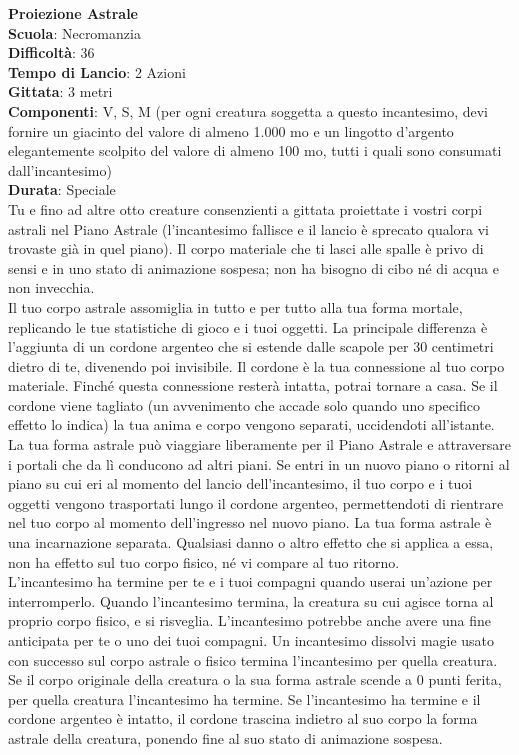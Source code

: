 \begin{multicols}{2}
\medskip\textbf{Proiezione Astrale}\\
\textbf{Scuola}: Necromanzia\\
\textbf{Difficoltà}: 36\\
\textbf{Tempo di Lancio}: 2 Azioni\\
\textbf{Gittata}: 3 metri\\
\textbf{Componenti}: V, S, M (per ogni creatura soggetta a questo incantesimo, devi fornire un giacinto del valore di almeno 1.000 mo e un lingotto d'argento elegantemente scolpito del valore di almeno 100 mo, tutti i quali sono consumati dall'incantesimo)\\
\textbf{Durata}: Speciale\\
Tu e fino ad altre otto creature consenzienti a gittata proiettate i vostri corpi astrali nel Piano Astrale (l'incantesimo fallisce e il lancio è sprecato qualora vi trovaste già in quel piano). Il corpo materiale che ti lasci alle spalle è privo di sensi e in uno stato di animazione sospesa; non ha bisogno di cibo né di acqua e non invecchia.\\
Il tuo corpo astrale assomiglia in tutto e per tutto alla tua forma mortale, replicando le tue statistiche di gioco e i tuoi oggetti. La principale differenza è l'aggiunta di un cordone argenteo che si estende dalle scapole per 30 centimetri dietro di te, divenendo poi invisibile. Il cordone è la tua connessione al tuo corpo materiale. Finché questa connessione resterà intatta, potrai tornare a casa. Se il cordone viene tagliato (un avvenimento che accade solo quando uno specifico effetto lo indica) la tua anima e corpo vengono separati, uccidendoti all'istante.\\
La tua forma astrale può viaggiare liberamente per il Piano Astrale e attraversare i portali che da lì conducono ad altri piani. Se entri in un nuovo piano o ritorni al piano su cui eri al momento del lancio dell'incantesimo, il tuo corpo e i tuoi oggetti vengono trasportati lungo il cordone argenteo, permettendoti di rientrare nel tuo corpo al momento dell'ingresso nel nuovo piano. La tua forma astrale è una incarnazione separata. Qualsiasi danno o altro effetto che si applica a essa, non ha effetto sul tuo corpo fisico, né vi compare al tuo ritorno.\\
L'incantesimo ha termine per te e i tuoi compagni quando userai un'azione per interromperlo. Quando l'incantesimo termina, la creatura su cui agisce torna al proprio corpo fisico, e si risveglia. L'incantesimo potrebbe anche avere una fine anticipata per te o uno dei tuoi compagni. Un incantesimo dissolvi magie usato con successo sul corpo astrale o fisico termina l'incantesimo per quella creatura. Se il corpo originale della creatura o la sua forma astrale scende a 0 punti ferita, per quella creatura l'incantesimo ha termine. Se l'incantesimo ha termine e il cordone argenteo è intatto, il cordone trascina indietro al suo corpo la forma astrale della creatura, ponendo fine al suo stato di animazione sospesa.\\

\end{multicols}
